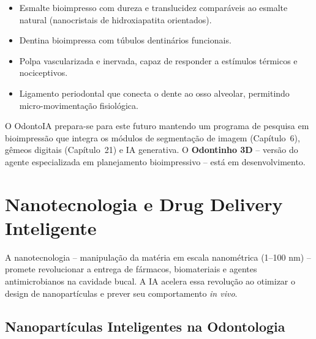 \begin{itemize}
  \item Esmalte bioimpresso com dureza e translucidez comparáveis ao esmalte
    natural (nanocristais de hidroxiapatita orientados).
  \item Dentina bioimpressa com túbulos dentinários funcionais.
  \item Polpa vascularizada e inervada, capaz de responder a estímulos térmicos
    e nociceptivos.
  \item Ligamento periodontal que conecta o dente ao osso alveolar, permitindo
    micro-movimentação fisiológica.
\end{itemize}

O OdontoIA prepara-se para este futuro mantendo um programa de pesquisa em
bioimpressão que integra os módulos de segmentação de imagem (Capítulo~6),
gêmeos digitais (Capítulo~21) e IA generativa. O \textbf{Odontinho 3D} --
versão do agente especializada em planejamento bioimpressivo -- está em
desenvolvimento.


\section{Nanotecnologia e Drug Delivery Inteligente}
\label{sec:nanotecnologia}

\nivelcinco

A nanotecnologia -- manipulação da matéria em escala nanométrica (1--100 nm) --
promete revolucionar a entrega de fármacos, biomateriais e agentes
antimicrobianos na cavidade bucal. A IA acelera essa revolução ao otimizar o
design de nanopartículas e prever seu comportamento \textit{in vivo}.


\subsection{Nanopartículas Inteligentes na Odontologia}

